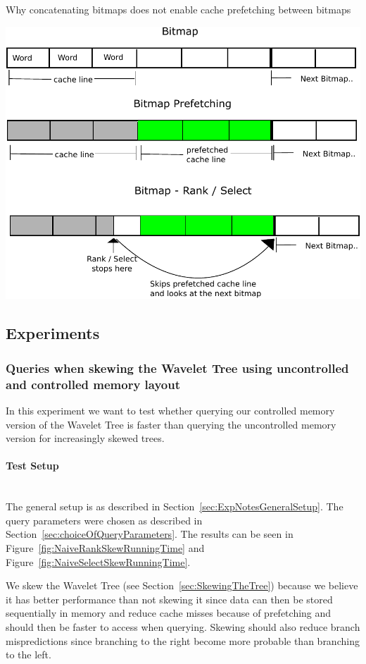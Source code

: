 \figureBegin
\caption{Why concatenating bitmaps does not enable cache prefetching between bitmaps}
\label{fig:QueryPrefetchFigure}
\includegraphics[width=\textwidth]{QueryPrefetchFigure.pdf}
\figureEnd



\subsection{Experiments}

\subsubsection{Queries when skewing the Wavelet Tree using uncontrolled and controlled memory layout}
In this experiment we want to test whether querying our controlled memory version of the Wavelet Tree is faster than querying the uncontrolled memory version for increasingly skewed trees. 

\paragraph{Test Setup}~\\
The general setup is as described in Section~\ref{sec:ExpNotesGeneralSetup}.
The query parameters were chosen as described in Section~\ref{sec:choiceOfQueryParameters}.
The results can be seen in Figure~\ref{fig:NaiveRankSkewRunningTime} and Figure~\ref{fig:NaiveSelectSkewRunningTime}.

We skew the Wavelet Tree (see Section~\ref{sec:SkewingTheTree}) because we believe it has better performance than not skewing it since data can then be stored sequentially in memory and reduce cache misses because of prefetching and should then be faster to access when querying.
Skewing should also reduce branch mispredictions since branching to the right become more probable than branching to the left. 

